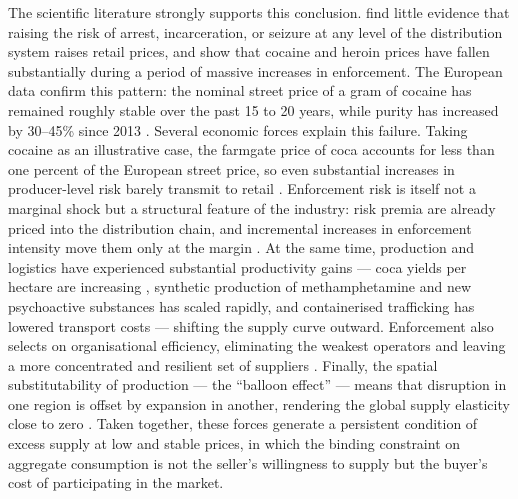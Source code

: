\documentclass[12pt, a4paper]{article}
\begin{document}
\noindent The scientific literature strongly supports this conclusion. \citet{pollack_reuter_2014} find little evidence that raising the risk of arrest, incarceration, or seizure at any level of the distribution system raises retail prices, and \citet{caulkins_reuter_taylor_2006} show that cocaine and heroin prices have fallen substantially during a period of massive increases in enforcement. The European data confirm this pattern: the nominal street price of a gram of cocaine has remained roughly stable over the past 15 to 20 years, while purity has increased by 30--45\% since 2013 \citep{euda_europol_cocaine_2022, werb_2011_violence}. Several economic forces explain this failure. Taking cocaine as an illustrative case, the farmgate price of coca accounts for less than one percent of the European street price, so even substantial increases in producer-level risk barely transmit to retail \citep{caulkins_reuter_2010}. Enforcement risk is itself not a marginal shock but a structural feature of the industry: risk premia are already priced into the distribution chain, and incremental increases in enforcement intensity move them only at the margin \citep{becker_murphy_grossman_2006}. At the same time, production and logistics have experienced substantial productivity gains --- coca yields per hectare are increasing \citep{unodc_2024}, synthetic production of methamphetamine and new psychoactive substances has scaled rapidly, and containerised trafficking has lowered transport costs --- shifting the supply curve outward. Enforcement also selects on organisational efficiency, eliminating the weakest operators and leaving a more concentrated and resilient set of suppliers \citep{castillo_mejia_restrepo_2020}. Finally, the spatial substitutability of production --- the ``balloon effect'' --- means that disruption in one region is offset by expansion in another, rendering the global supply elasticity close to zero \citep{mejia_restrepo_2016}. Taken together, these forces generate a persistent condition of excess supply at low and stable prices, in which the binding constraint on aggregate consumption is not the seller's willingness to supply but the buyer's cost of participating in the market.
\end{document}
